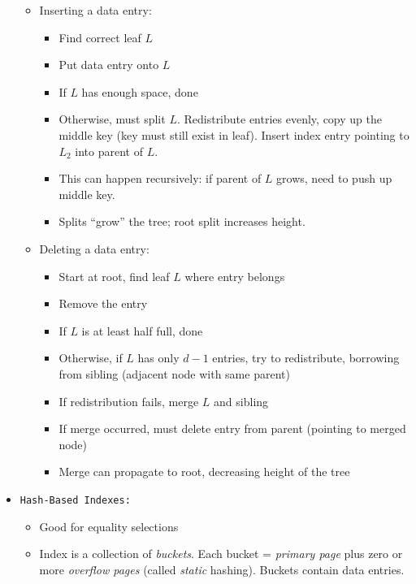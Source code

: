 \documentclass[landscape,8pt]{extarticle}
\newcommand{\code}{\lstinline}
\begin{document}
\begin{multicols}{5}
\begin{itemize}
\begin{itemize}
                  \item Inserting a data entry:
                        \begin{itemize}
                            \item Find correct leaf $L$
                            \item Put data entry onto $L$
                            \item If $L$ has enough space, done
                            \item Otherwise, must split $L$. Redistribute entries evenly, copy up the middle key (key must still exist in leaf). Insert index entry pointing to $L_2$ into parent of $L$.
                            \item This can happen recursively: if parent of $L$ grows, need to push up middle key.
                            \item Splits ``grow'' the tree; root split increases height.
                        \end{itemize}
                  \item Deleting a data entry:
                        \begin{itemize}
                            \item Start at root, find leaf $L$ where entry belongs
                            \item Remove the entry
                            \item If $L$ is at least half full, done
                            \item Otherwise, if $L$ has only $d-1$ entries, try to redistribute, borrowing from sibling (adjacent node with same parent)
                            \item If redistribution fails, merge $L$ and sibling
                            \item If merge occurred, must delete entry from parent (pointing to merged node)
                            \item Merge can propagate to root, decreasing height of the tree
                        \end{itemize}
              \end{itemize}
        \item \code{Hash-Based Indexes:}
              \begin{itemize}
                  \item Good for equality selections
                  \item Index is a collection of \emph{buckets}. Each bucket = \emph{primary page} plus zero or more \emph{overflow pages} (called \emph{static} hashing). Buckets contain data entries.

\end{itemize}
\end{itemize}
\end{multicols}
\end{document}
